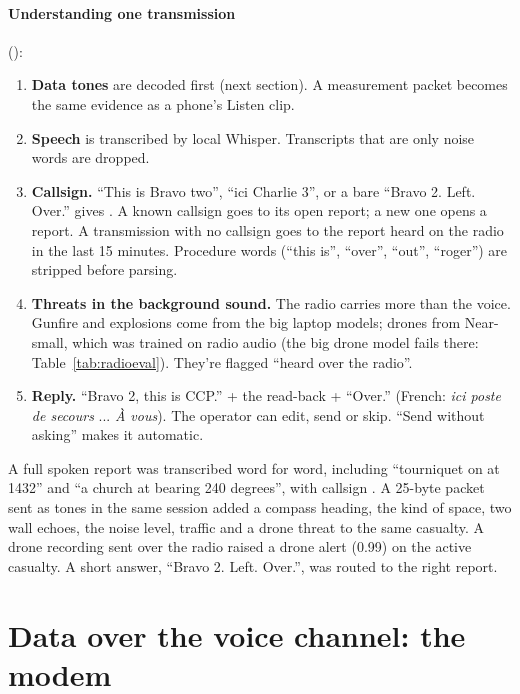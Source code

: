 \paragraph{Understanding one transmission} ():
\begin{enumerate}
  \item \textbf{Data tones} are decoded first (next section). A measurement packet becomes the same evidence as a phone's Listen
        clip.
  \item \textbf{Speech} is transcribed by local Whisper. Transcripts that are only noise words are dropped.
  \item \textbf{Callsign.} ``This is Bravo two'', ``ici Charlie 3'', or a bare ``Bravo 2. Left. Over.'' gives .
        A known callsign goes to its open report; a new one opens a report. A transmission with no callsign goes to the
        report heard on the radio in the last 15 minutes. Procedure words (``this is'', ``over'', ``out'', ``roger'') are
        stripped before parsing.
  \item \textbf{Threats in the background sound.} The radio carries more than the voice. Gunfire and explosions come from the
        big laptop models; drones from Near-small, which was trained on radio audio (the big drone model fails there:
        Table~\ref{tab:radioeval}). They're flagged ``heard over the radio''.
  \item \textbf{Reply.} ``Bravo 2, this is CCP.'' + the read-back + ``Over.'' (French: \emph{ici poste de secours} ...
        \emph{À vous}). The operator can edit, send or skip. ``Send without asking'' makes it automatic.
\end{enumerate}

\begin{keyresult}
A full spoken report was transcribed word for word, including ``tourniquet on at 1432'' and ``a church at bearing 240
degrees'', with callsign . A 25-byte packet sent as tones in the same session added a compass heading, the
kind of space, two wall echoes, the noise level, traffic and a drone threat to the same casualty. A drone recording sent over
the radio raised a drone alert (0.99) on the active casualty. A short answer, ``Bravo 2. Left. Over.'', was routed to the
right report.
\end{keyresult}

\section{Data over the voice channel: the modem}

